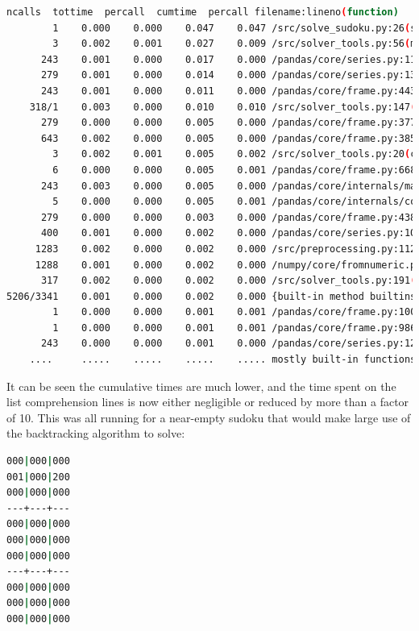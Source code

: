 \documentclass[12pt]{report} %
\begin{document}
\begin{lstlisting}[language=Bash, basicstyle=\tiny]
   ncalls  tottime  percall  cumtime  percall filename:lineno(function)
        1    0.000    0.000    0.047    0.047 /src/solve_sudoku.py:26(solve_sudoku)
        3    0.002    0.001    0.027    0.009 /src/solver_tools.py:56(markup)
      243    0.001    0.000    0.017    0.000 /pandas/core/series.py:1180(__setitem__)
      279    0.001    0.000    0.014    0.000 /pandas/core/series.py:1396(_maybe_update_cacher)
      243    0.001    0.000    0.011    0.000 /pandas/core/frame.py:4430(_maybe_cache_changed)
    318/1    0.003    0.000    0.010    0.010 /src/solver_tools.py:147(backtrack_alg)
      279    0.000    0.000    0.005    0.000 /pandas/core/frame.py:3779(_ixs)
      643    0.002    0.000    0.005    0.000 /pandas/core/frame.py:3856(__getitem__)
        3    0.002    0.001    0.005    0.002 /src/solver_tools.py:20(check_sudoku)
        6    0.000    0.000    0.005    0.001 /pandas/core/frame.py:668(__init__)
      243    0.003    0.000    0.005    0.000 /pandas/core/internals/managers.py:1045(iset)
        5    0.000    0.000    0.005    0.001 /pandas/core/internals/construction.py:423(dict_to_mgr)
      279    0.000    0.000    0.003    0.000 /pandas/core/frame.py:4387(_box_col_values)
      400    0.001    0.000    0.002    0.000 /pandas/core/series.py:1016(__getitem__)
     1283    0.002    0.000    0.002    0.000 /src/preprocessing.py:112(box)
     1288    0.001    0.000    0.002    0.000 /numpy/core/fromnumeric.py:1768(ravel)
      317    0.002    0.000    0.002    0.000 /src/solver_tools.py:191(<listcomp>)
5206/3341    0.001    0.000    0.002    0.000 {built-in method builtins.len}
        1    0.000    0.000    0.001    0.001 /pandas/core/frame.py:10039(map)
        1    0.000    0.000    0.001    0.001 /pandas/core/frame.py:9867(apply)
      243    0.000    0.000    0.001    0.000 /pandas/core/series.py:1270(_set_with_engine)
    ....     .....    .....    .....    ..... mostly built-in functions of packages

\end{lstlisting}

It can be seen the cumulative times are much lower, and the time spent on the list comprehension lines is now either negligible or reduced by more than a factor of 10. This was all running for a near-empty sudoku that would make large use of the backtracking algorithm to solve:

\begin{lstlisting}[language=Bash]
000|000|000
001|000|200
000|000|000
---+---+---
000|000|000
000|000|000
000|000|000
---+---+---
000|000|000
000|000|000
000|000|000
\end{lstlisting}
\end{document}
